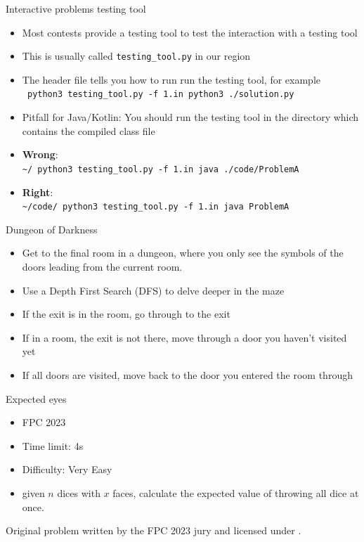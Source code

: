 \documentclass[11pt,pdf, aspectratio=169]{beamer}
\begin{document}
  \begin{frame}{Interactive problems testing tool}
    \begin{itemize}
      \item Most contests provide a testing tool to test the interaction with a testing tool
      \item This is usually called \texttt{testing\_tool.py} in our region
      \item The header file tells you how to run run the testing tool, for example\\\texttt{\textdollar{} python3 testing\_tool.py -f 1.in python3 ./solution.py}
      \item Pitfall for Java/Kotlin: You should run the testing tool in the directory which contains the compiled class file

      \item \textbf{Wrong}:\\\texttt{\textasciitilde/\textdollar{} python3 testing\_tool.py -f 1.in java ./code/ProblemA}
      \item \textbf{Right}:\\\texttt{\textasciitilde/code/\textdollar{} python3 testing\_tool.py -f 1.in java ProblemA}
    \end{itemize}
  \end{frame}
  \begin{frame}{Dungeon of Darkness}
    \begin{itemize}
      \item<1-> Get to the final room in a dungeon, where you only see the symbols of the doors leading from the current room.
      \item<2-> Use a Depth First Search (DFS) to delve deeper in the maze
      \item<3-> If the exit is in the room, go through to the exit
      \item<3-> If in a room, the exit is not there, move through a door you haven't visited yet
      \item<3-> If all doors are visited, move back to the door you entered the room through
    \end{itemize}
  \end{frame}
  \begin{frame}{Expected eyes}
    \begin{itemize}
      \item FPC 2023
      \item Time limit: 4s
      \item Difficulty: Very Easy
      \item given $n$ dices with $x$ faces, calculate the expected value of throwing all dice at once.
    \end{itemize}
    Original problem written by the FPC 2023 jury and licensed under \doclicenseLongNameRef.

    \doclicenseImage

  \end{frame}
\end{document}
